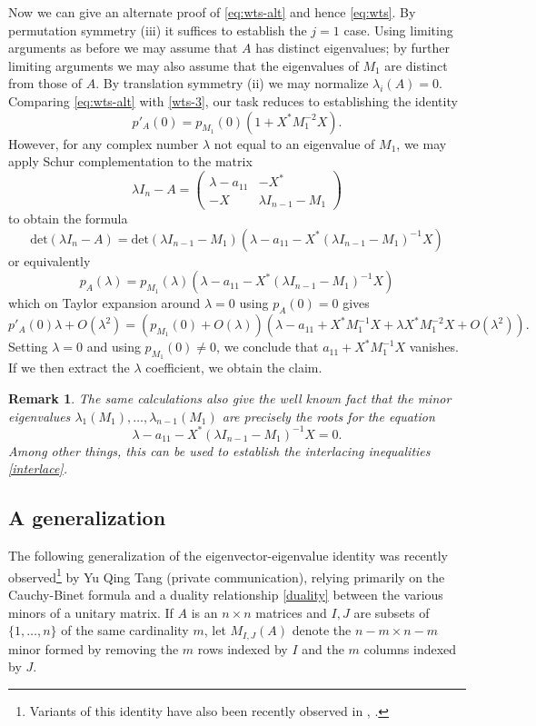 \documentclass{amsart}
\newtheorem{remark}[lemma]{Remark}
\begin{document}
Now we can give an alternate proof of \eqref{eq:wts-alt} and hence \eqref{eq:wts}.  By permutation symmetry (iii) it suffices to establish the $j=1$ case.  Using limiting arguments as before we may assume that $A$ has distinct eigenvalues; by further limiting arguments we may also assume that the eigenvalues of $M_1$ are distinct from those of $A$.  By translation symmetry (ii) we may normalize $\lambda_i(A) = 0$.  Comparing \eqref{eq:wts-alt} with \eqref{wts-3}, our task reduces to establishing the identity
$$ p'_A(0)  = p_{M_1}(0) (1 + X^* M_1^{-2} X).$$
However, for any complex number $\lambda$ not equal to an eigenvalue of $M_1$, we may apply Schur complementation \cite{cottle} to the matrix
$$ \lambda I_n - A = \begin{pmatrix} \lambda - a_{11} & -X^* \\ -X & \lambda I_{n-1} - M_1 \end{pmatrix} $$
to obtain the formula
$$ \mathrm{det}( \lambda I_n - A ) = \mathrm{det}( \lambda I_{n-1} - M_1 ) (\lambda - a_{11} - X^* (\lambda I_{n-1} - M_1)^{-1} X )$$
or equivalently
$$ p_A(\lambda) = p_{M_1}(\lambda) (\lambda - a_{11} - X^* (\lambda I_{n-1} - M_1)^{-1} X )$$
which on Taylor expansion around $\lambda=0$ using $p_A(0)=0$ gives
$$ p'_A(0) \lambda + O(\lambda^2) = (p_{M_1}(0) + O(\lambda)) ( \lambda - a_{11} + X^* M_1^{-1} X + \lambda X^* M_1^{-2} X + O(\lambda^2)).$$
Setting $\lambda=0$ and using $p_{M_1}(0) \neq 0$, we conclude that $a_{11} + X^* M_1^{-1} X$ vanishes.  If we then extract the $\lambda$ coefficient, we obtain the claim.

\begin{remark}  The same calculations also give the well known fact that the minor eigenvalues $\lambda_1(M_1),\dots,\lambda_{n-1}(M_1)$ are precisely the roots for the equation
$$ \lambda - a_{11} - X^* (\lambda I_{n-1} - M_1)^{-1} X = 0.$$
Among other things, this can be used to establish the interlacing inequalities \eqref{interlace}.
\end{remark}

\subsection{A generalization}

The following generalization of the eigenvector-eigenvalue identity was recently observed\footnote{Variants of this identity have also been recently observed in \cite{chen}, \cite{stawiska}.} by Yu Qing Tang (private communication), relying primarily on the Cauchy-Binet formula and a duality relationship \eqref{duality} between the various minors of a unitary matrix.  If $A$ is an $n \times n$ matrices and $I,J$ are subsets of $\{1,\dots,n\}$ of the same cardinality $m$, let $M_{I,J}(A)$ denote the $n-m \times n-m$ minor formed by removing the $m$ rows indexed by $I$ and the $m$ columns indexed by $J$.
\end{document}
